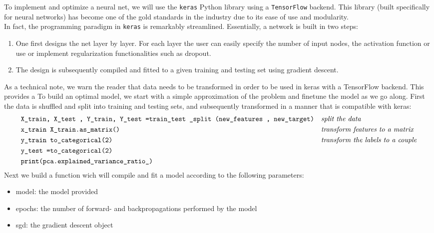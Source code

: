 \documentclass[14pt]{article}
\theoremstyle{plain}
\theoremstyle{definition}
\newcommand{\un}{\textunderscore}
\begin{document}
To implement and optimize a neural net, we will  use the \texttt{keras} Python library using a \texttt{TensorFlow} backend. This library (built specifically for neural networks) has become one of the gold standards in the industry due to its ease of use and modularity.\\
In fact, the programming paradigm in \texttt{keras} is remarkably streamlined. Essentially, a network is built in two steps:
\begin{enumerate}
\item One first designs the net layer by layer. For each layer the user can easily specify the number of input nodes, the activation function or use or implement regularization functionalities such as dropout.
\item	The design is subsequently compiled and fitted to a given training and testing set using gradient descent.
\end{enumerate}
As a technical note, we warn the reader that data needs to be transformed in order to be used in keras with a TensorFlow backend. This provides a 
To build an optimal model, we start with a simple approximation of the problem and finetune the model as we go along. First the data is shuffled and split into training and testing sets, and subsequently transformed in a manner that is compatible with keras:
\begin{align*}
  &\texttt{X\un train, X\un test , Y\un train, Y\un test =train\un test \un split (new\un features , new\un target)}& & \textit{split the data}\\
  &\texttt{x\un train X\un train.as\un matrix()}&         &\textit{transform features to a matrix}\\
  & \texttt{y\un train to\un categorical(2)}&         &\textit{transform the labels to a couple}\\
   &\texttt{y\un test =to\un categorical(2)}\\  & \texttt{print(pca.explained\textunderscore variance\textunderscore ratio\textunderscore)}&			&\\
\end{align*}
Next we build a function wich will compile and fit a model according to the following parameters:
\begin{itemize}
\item model: the model provided
\item epochs: the number of forward- and backpropagations performed by the model
\item sgd: the gradient descent object	
\end{itemize}
\end{document}
